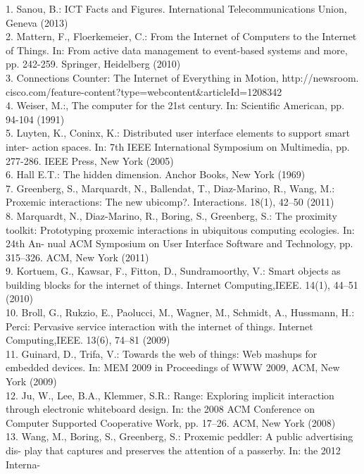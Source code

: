 \documentclass[runningheads,a4paper]{llncs}
\begin{document}
\begin{thebibliography}{4}
1. Sanou, B.: ICT Facts and Figures. International Telecommunications Union, Geneva
(2013)\\
2. Mattern, F., Floerkemeier, C.: From the Internet of Computers to the Internet of
Things. In: From active data management to event-based systems and more, pp.
242-259. Springer, Heidelberg (2010)\\
3. Connections Counter: The Internet of Everything in Motion, http://newsroom.
cisco.com/feature-content?type=webcontent&articleId=1208342\\
4. Weiser, M.:, The computer for the 21st century. In: Scientific American, pp. 94-104
(1991)\\
5. Luyten, K., Coninx, K.: Distributed user interface elements to support smart inter-
action spaces. In: 7th IEEE International Symposium on Multimedia, pp. 277-286.
IEEE Press, New York (2005)\\
6. Hall E.T.: The hidden dimension. Anchor Books, New York (1969)\\
7. Greenberg, S., Marquardt, N., Ballendat, T., Diaz-Marino, R., Wang, M.: Proxemic
interactions: The new ubicomp?. Interactions. 18(1), 42–50 (2011)\\
8. Marquardt, N., Diaz-Marino, R., Boring, S., Greenberg, S.: The proximity toolkit:
Prototyping proxemic interactions in ubiquitous computing ecologies. In: 24th An-
nual ACM Symposium on User Interface Software and Technology, pp. 315–326.
ACM, New York (2011)\\
9. Kortuem, G., Kawsar, F., Fitton, D., Sundramoorthy, V.: Smart objects as building
blocks for the internet of things. Internet Computing,IEEE. 14(1), 44–51 (2010)\\
10. Broll, G., Rukzio, E., Paolucci, M., Wagner, M., Schmidt, A., Hussmann, H.: Perci:
Pervasive service interaction with the internet of things. Internet Computing,IEEE.
13(6), 74–81 (2009)\\
11. Guinard, D., Trifa, V.: Towards the web of things: Web mashups for embedded
devices. In: MEM 2009 in Proceedings of WWW 2009, ACM, New York (2009)\\
12. Ju, W., Lee, B.A., Klemmer, S.R.: Range: Exploring implicit interaction through
electronic whiteboard design. In: the 2008 ACM Conference on Computer Supported
Cooperative Work, pp. 17–26. ACM, New York (2008)\\
13. Wang, M., Boring, S., Greenberg, S.: Proxemic peddler: A public advertising dis-
play that captures and preserves the attention of a passerby. In: the 2012 Interna-

\end{thebibliography}
\end{document}
